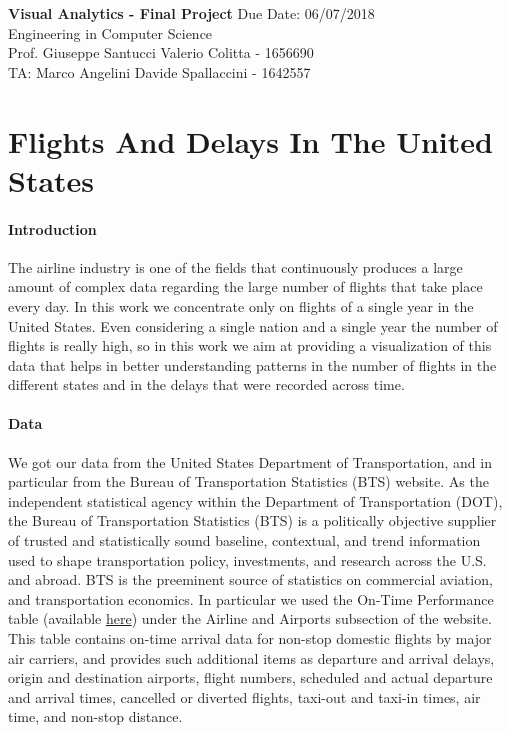 \documentclass[a4paper, 12pt]{article}
\begin{document}
\noindent
\large\textbf{Visual Analytics - Final Project} \normalsize \hfill Due Date: 06/07/2018 \\
\normalsize Engineering in Computer Science   \\
Prof. Giuseppe Santucci \hfill Valerio Colitta - 1656690 \\
TA: Marco Angelini \hfill Davide Spallaccini - 1642557

\section*{Flights And Delays In The United States}

\paragraph{Introduction}
The airline industry is one of the fields that continuously produces a large amount of complex data
regarding the large number of flights that take place every day. In this work we concentrate only on
flights of a single year in the United States. Even considering a single nation and a single year the
number of flights is really high, so in this work we aim at providing a visualization of this data that
helps in better understanding patterns in the number of flights in the different states and in the 
delays that were recorded across time.

\paragraph*{Data}
We got our data from the United States Department of Transportation, and in particular from the 
Bureau of Transportation Statistics (BTS) website. As the independent statistical agency within the
Department of Transportation (DOT), the Bureau of Transportation Statistics (BTS) is a politically
objective supplier of trusted and statistically sound baseline, contextual, and trend information used
to shape transportation policy, investments, and research across the U.S. and abroad. BTS is the
preeminent source of statistics on commercial aviation, and transportation economics.
In particular we used the On-Time Performance table (available 
\href{https://www.transtats.bts.gov/DL_SelectFields.asp?Table_ID=236}{here}) 
under the Airline and Airports subsection of the website. 
This table contains on-time arrival data for non-stop domestic flights by
major air carriers, and provides such additional items as departure and arrival delays, origin and
destination airports, flight numbers, scheduled and actual departure and arrival times, cancelled or
diverted flights, taxi-out and taxi-in times, air time, and non-stop distance.
\\
\end{document}
